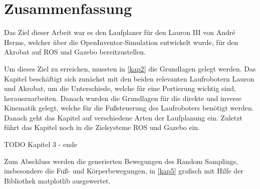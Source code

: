 \chapter{Zusammenfassung}
\label{kap6}

Das Ziel dieser Arbeit war es den Laufplaner für den Lauron III von André Herms, welcher über die OpenInventor-Simulation entwickelt wurde, für den Akrobat auf \ac{ROS} und Gazebo bereitzustellen.

Um dieses Ziel zu erreichen, mussten in \autoref{kap2} die Grundlagen gelegt werden. Das Kapitel beschäftigt sich zunächst mit den beiden relevanten Laufrobotern Lauron und Akrobat, um die Unterschiede, welche für eine  Portierung wichtig sind, herauszuarbeiten. Danach wurden die Grundlagen für die direkte und inverse Kinematik gelegt, welche für die Fußsteuerung des Laufroboters benötigt werden. Danach geht das Kapitel auf verschiedene Arten der Laufplanung ein. Zuletzt führt das Kapitel noch in die Zielsysteme \acf{ROS} und Gazebo ein.

TODO Kapitel 3 - ende

Zum Abschluss werden die generierten Bewegungen des Random Samplings, insbesondere die Fuß- und Körperbewegungen, in \autoref{kap5} grafisch mit Hilfe der Bibliothek matplotlib ausgewertet.